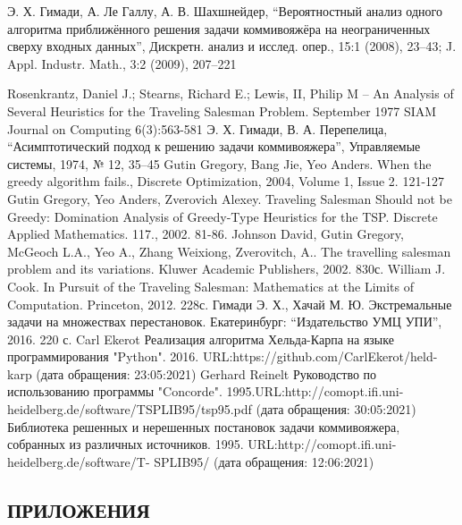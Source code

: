 \documentclass[a4paper, 14pt]{extarticle}
\numberwithin{equation}{section}
\begin{document}
\begin{thebibliography}{}
      Э. Х. Гимади, А. Ле Галлу, А. В. Шахшнейдер, “Вероятностный анализ одного алгоритма приближённого решения задачи коммивояжёра на неограниченных сверху входных данных”, Дискретн. анализ и исслед. опер., 15:1 (2008), 23–43; J. Appl. Industr. Math., 3:2 (2009), 207–221

      Rosenkrantz, Daniel J.; Stearns, Richard E.; Lewis, II, Philip M -- An Analysis of Several Heuristics for the Traveling Salesman Problem. September 1977 SIAM Journal on Computing 6(3):563-581
      Э. Х. Гимади, В. А. Перепелица, “Асимптотический подход к решению задачи коммивояжера”, Управляемые системы, 1974, № 12, 35–45
      Gutin Gregory, Bang Jie, Yeo Anders. When the greedy algorithm fails., Discrete Optimization, 2004, Volume 1, Issue 2. 121-127
      Gutin Gregory, Yeo Anders, Zverovich Alexey. Traveling Salesman Should not be Greedy: Domination Analysis of Greedy-Type Heuristics for the TSP. Discrete Applied Mathematics. 117., 2002. 81-86.
      Johnson David, Gutin Gregory, McGeoch L.A., Yeo A., Zhang Weixiong, Zverovitch, A.. The travelling salesman problem and its variations. Kluwer Academic Publishers, 2002. 830с.
      William J. Cook. In Pursuit of the Traveling Salesman: Mathematics at the Limits of Computation. Princeton, 2012. 228с.
      Гимади Э. Х., Хачай М. Ю. Экстремальные задачи на множествах перестановок. Екатеринбург: “Издательство УМЦ УПИ”, 2016. 220 с.
      Carl Ekerot Реализация алгоритма Хельда-Карпа на языке программирования "Python". 2016. URL:https://github.com/CarlEkerot/held-karp (дата обращения: 23:05:2021)
      Gerhard Reinelt Руководство по использованию программы "Concorde". 1995.URL:http://comopt.ifi.uni-heidelberg.de/software/TSPLIB95/tsp95.pdf (дата обращения: 30:05:2021)
      Библиотека решенных и нерешенных постановок задачи коммивояжера, собранных из различных источников. 1995. URL:http://comopt.ifi.uni-heidelberg.de/software/T-
SPLIB95/ (дата обращения: 12:06:2021)
\end{thebibliography}

\newpage

\begin{center}
\chapter{\textbf{ПРИЛОЖЕНИЯ}}
\end{center}
\end{document}
